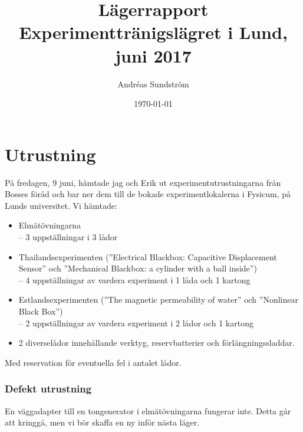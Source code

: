 \documentclass[11pt,a4paper, 
english, swedish %
]{article}
\begin{document}


%


\title{Lägerrapport \\
{\Large Experimenttränigslägret i Lund, juni 2017} }
\author{Andréas Sundström}
\date{\today}

\maketitle


\section*{Utrustning}
På fredagen, 9 juni, hämtade jag och Erik ut experimentutrustningarna
från Bosses föråd och bar ner dem till de bokade experimentlokalerna i
Fysicum, på Lunds universitet. 
Vi hämtade:
\begin{itemize}
\item Elmätövningarna 
      \\ -- 3 uppställningar i 3 lådor
\item Thailandsexperimenten 
(''Electrical Blackbox: Capacitive Displacement Sensor'' och
 ''Mechanical Blackbox: a cylinder with a ball inside'') 
      \\ -- 4 uppställningar av vardera experiment i 1 låda och 1 kartong
\item Estlandsexperimenten 
(''The magnetic permeability of water'' och
 ''Nonlinear Black Box'')
      \\ -- 2 uppställningar av vardera experiment i 2 lådor och 1 kartong
\item 2 diverselådor innehållande verktyg, reservbatterier och förlängningssladdar. 
\end{itemize}
Med reservation för eventuella fel i antalet lådor.

\subsubsection*{Defekt utrustning}
En väggadapter till en tongenerator i elmätövningarna fungerar
inte. Detta går att kringgå, men vi bör skaffa en ny inför nästa
läger. 
\end{document}
